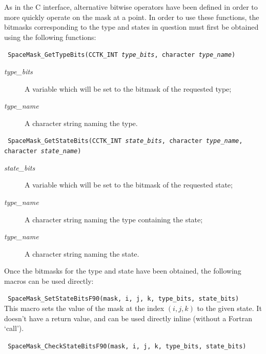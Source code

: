 \documentclass{article}
\begin{document}
As in the C interface, alternative bitwise operators have been defined
in order to more quickly operate on the mask at a point. In order to
use these functions, the bitmasks corresponding to the type and states
in question must first be obtained using the following functions:

\indent\parbox{\linewidth}{
\vspace{\baselineskip}\noindent\texttt{
  SpaceMask\_GetTypeBits(CCTK\_INT \emph{type\_bits},
    character \emph{type\_name})
}
\hspace*{10mm}\parbox{\linewidth}{
\begin{description}
  \item[\emph{type\_bits}] A variable which will be set to the bitmask of
    the requested type;
  \item[\emph{type\_name}] A character string naming the type.
\end{description}
}}

\indent\parbox{\linewidth}{
\vspace{\baselineskip}\noindent\texttt{
  SpaceMask\_GetStateBits(CCTK\_INT \emph{state\_bits},
    character \emph{type\_name},\\\hspace*{10mm} character \emph{state\_name})
}\\
\hspace*{10mm}\parbox{\linewidth}{
\begin{description}
  \item[\emph{state\_bits}] A variable which will be set to the bitmask of
    the requested state;
  \item[\emph{type\_name}] A character string naming the type
    containing the state;
  \item[\emph{type\_name}] A character string naming the state.
\end{description}
}}

\noindent Once the bitmasks for the type and state have been obtained,
the following macros can be used directly:

\vspace{\baselineskip}\noindent\texttt{
  SpaceMask\_SetStateBitsF90(mask, i, j, k, type\_bits, state\_bits)
}\\

\noindent This macro sets the value of the mask at the index $(i,j,k)$
to the given state. It doesn't have a return value, and can be used
directly inline (without a Fortran `call').

\vspace{\baselineskip}\noindent\texttt{
  SpaceMask\_CheckStateBitsF90(mask, i, j, k, type\_bits, state\_bits)
}\\
\end{document}
